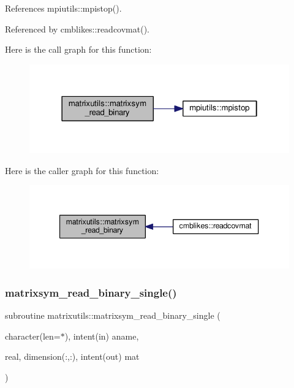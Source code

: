References mpiutils\+::mpistop().



Referenced by cmblikes\+::readcovmat().

Here is the call graph for this function\+:
\nopagebreak
\begin{figure}[H]
\begin{center}
\leavevmode
\includegraphics[width=322pt]{namespacematrixutils_a7572f4e0a0c8b958126d5d3c8b46f16a_cgraph}
\end{center}
\end{figure}
Here is the caller graph for this function\+:
\nopagebreak
\begin{figure}[H]
\begin{center}
\leavevmode
\includegraphics[width=344pt]{namespacematrixutils_a7572f4e0a0c8b958126d5d3c8b46f16a_icgraph}
\end{center}
\end{figure}
\mbox{\label{namespacematrixutils_a592726195f2a952a006391bde92cd2b0}} 
\subsubsection{\texorpdfstring{matrixsym\+\_\+read\+\_\+binary\+\_\+single()}{matrixsym\_read\_binary\_single()}}
{\footnotesize\ttfamily subroutine matrixutils\+::matrixsym\+\_\+read\+\_\+binary\+\_\+single (\begin{DoxyParamCaption}\item[{character(len=$\ast$), intent(in)}]{aname,  }\item[{real, dimension(\+:,\+:), intent(out)}]{mat }\end{DoxyParamCaption})}




